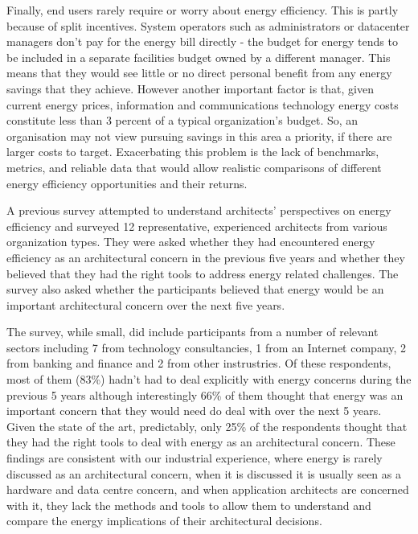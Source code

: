 Finally, end users rarely require or worry about energy efficiency. This is partly because of split incentives. System operators such as administrators or datacenter managers don't pay for the energy bill directly - the budget for energy tends to be included in a separate facilities budget owned by a different manager. This means that they would see little or no direct personal benefit from any energy savings that they achieve. However another important factor is that, given current energy prices, information and communications technology energy costs constitute less than 3 percent of a typical organization's budget. So, an organisation may not view pursuing savings in this area a priority, if there are larger costs to target. Exacerbating this problem is the lack of benchmarks, metrics, and reliable data that would allow realistic comparisons of different energy efficiency opportunities and their returns.

A previous survey attempted to understand architects' perspectives on energy efficiency \cite{bashroush2016-datacentreenergy} and surveyed 12 representative, experienced architects from various organization types. They were asked whether they had encountered energy efficiency as an architectural concern in the previous five years and whether they believed that they had the right tools to address energy related challenges. The survey also asked whether the participants believed that energy would be an important architectural concern over the next five years.

The survey, while small, did include participants from a number of relevant sectors including 7 from technology consultancies, 1 from an Internet company, 2 from banking and finance and 2 from other instrustries.  Of these respondents, most of them (83\%) hadn't had to deal explicitly with energy concerns during the previous 5 years although interestingly 66\% of them thought that energy was an important concern that they would need do deal with over the next 5 years.  Given the state of the art, predictably, only 25\% of the respondents thought that they had the right tools to deal with energy as an architectural concern.  These findings are consistent with our industrial experience, where energy is rarely discussed as an architectural concern, when it is discussed it is usually seen as a hardware and data centre concern, and when application architects are concerned with it, they lack the methods and tools to allow them to understand and compare the energy implications of their architectural decisions.

